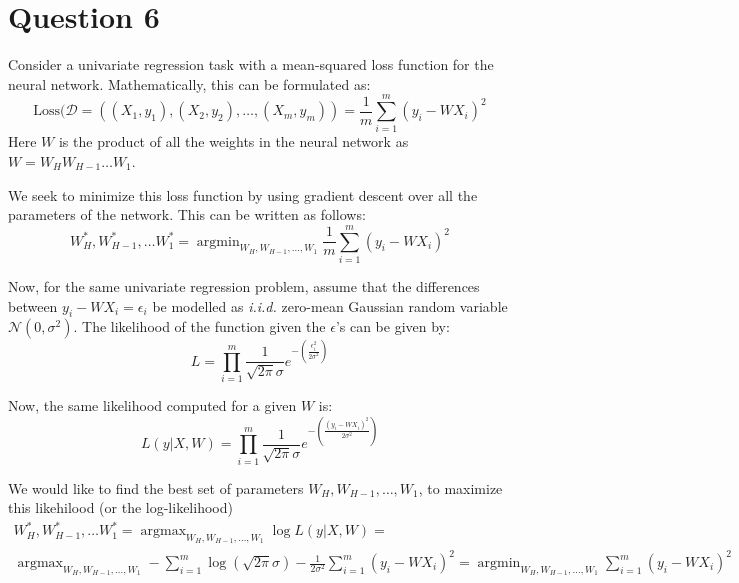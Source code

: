 \documentclass{article}
\newcommand{\argmin}{\mathop{\mathrm{argmin}}}
\newcommand{\argmax}{\mathop{\mathrm{argmax}}}
\begin{document}
\section*{Question 6}
\begin{flushleft}
Consider a univariate regression task with a mean-squared loss function for the neural network. Mathematically, this can be formulated as:
\begin{equation}
\displaystyle \text{Loss}(\mathcal{D} = ((X_1, y_1), (X_2, y_2), \ldots, (X_m, y_m)) = \frac{1}{m}\sum_{i=1}^{m} (y_{i} - WX_{i})^{2}
\end{equation}
Here \(W\) is the product of all the weights in the neural network as \(W = W_{H}W_{H-1}\ldots W_{1}\).

We seek to minimize this loss function by using gradient descent over all the parameters of the network. This can be written as follows:
\begin{equation}
\label{gd}
W^{*}_{H}, W^{*}_{H-1}, \ldots W^{*}_{1} = \argmin_{W_{H}, W_{H-1}, \ldots, W_{1}} \frac{1}{m}\sum_{i=1}^{m} (y_{i} - WX_{i})^{2}
\end{equation}

Now, for the same univariate regression problem, assume that the differences between \(y_{i} - WX_{i} = \epsilon_{i}\) be modelled as \textit{i.i.d.} zero-mean Gaussian random variable \(\mathcal{N}(0, \sigma^{2})\). The likelihood of the function given the \(\epsilon\)'s can be given by:
\begin{equation}
\displaystyle L = \prod_{i=1}^{m} \frac{1}{\sqrt{2\pi} \sigma} e^{-\left(\frac{\epsilon_{i}^{2}}{2\sigma^{2}}\right)}
\end{equation}

Now, the same likelihood computed for a given \(W\) is:
\begin{equation}
\displaystyle L(y | X, W) = \prod_{i=1}^{m} \frac{1}{\sqrt{2\pi} \sigma} e^{-\left(\frac{(y_{i} - WX_{i})^2}{2\sigma^{2}}\right)}
\end{equation}

We would like to find the best set of parameters \(W_{H}, W_{H-1}, \ldots, W_{1}\), to maximize this likehilood (or the log-likelihood)
\begin{multline}
\label{mle}
\displaystyle W^{*}_{H}, W^{*}_{H-1}, \ldots W^{*}_{1} = \argmax_{W_{H}, W_{H-1}, \ldots, W_{1}} \log L(y | X, W) = \\
\argmax_{W_{H}, W_{H-1}, \ldots, W_{1}} -\sum_{i=1}^{m} \log(\sqrt{2\pi}\sigma) - \frac{1}{2\sigma^{2}} \sum_{i=1}^{m} (y_{i} - WX_{i})^2 = \argmin_{W_{H}, W_{H-1}, \ldots, W_{1}} \sum_{i=1}^{m} (y_{i} - WX_{i})^2
\end{multline}


\end{flushleft}
\end{document}
